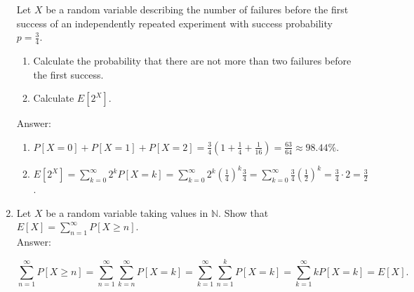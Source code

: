 \documentclass{article}
\begin{document}
\begin{enumerate}
Let $X$ be a random variable describing the number of failures before the first success of
an independently repeated experiment with success probability $p = \frac{3}{4}$.

\begin{enumerate}
\item Calculate the probability that there are not more than two failures before the first success.

\item Calculate $E[2^X]$.

\end{enumerate}

Answer: 

\begin{enumerate}
\item $P[X = 0] + P[X = 1] + P[X = 2] = \frac{3}{4}(1 + \frac{1}{4} + \frac{1}{16}) = \frac{63}{64} \approx 98.44\%$.

\item $E[2^X] = \sum_{k=0}^\infty 2^k P[X = k] 
= \sum_{k=0}^\infty 2^k \left(\frac{1}{4}\right)^k\frac{3}{4}
= \sum_{k=0}^\infty \frac{3}{4}\left(\frac{1}{2}\right)^k = \frac{3}{4} \cdot 2 = \frac{3}{2}$.

\end{enumerate}

\item 

Let $X$ be a random variable taking values in $\mathbb{N}$. Show that $E[X] = \sum_{n=1}^\infty P[X \geq n]$. \\

Answer: 

$$
\sum_{n=1}^\infty P[X \geq n]
= \sum_{n=1}^\infty \sum_{k = n}^\infty P[X = k] 
= \sum_{k=1}^\infty \sum_{n=1}^k P[X = k]
= \sum_{k=1}^\infty kP[X=k]
= E[X].
$$




\end{enumerate}
\end{document}
